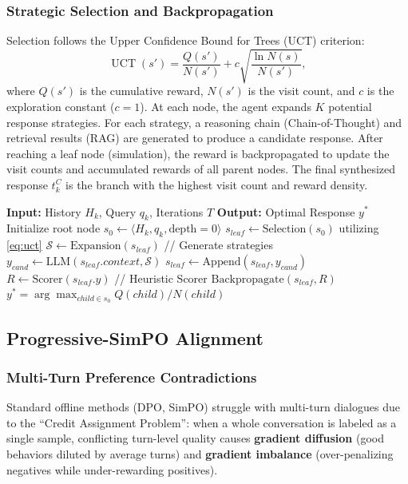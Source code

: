 \documentclass[lettersize,journal]{IEEEtran}
\begin{document}
\subsubsection{Strategic Selection and Backpropagation}
Selection follows the Upper Confidence Bound for Trees (UCT) criterion:
\begin{equation}
\label{eq:uct}
\operatorname{UCT}(s') = \frac{Q(s')}{N(s')} + c \sqrt{\frac{\ln N(s)}{N(s')}},
\end{equation}
where $Q(s')$ is the cumulative reward, $N(s')$ is the visit count, and $c$ is the exploration constant ($c=1$). 
At each node, the agent expands $K$ potential response strategies. For each strategy, a reasoning chain (Chain-of-Thought) and retrieval results (RAG) are generated to produce a candidate response. After reaching a leaf node (simulation), the reward is backpropagated to update the visit counts and accumulated rewards of all parent nodes. The final synthesized response $t_k^C$ is the branch with the highest visit count and reward density.

\begin{algorithm}[H]
\caption{CoRA-MCTS for Counselor Agency}
\label{alg:mcts}
\begin{algorithmic}[1]
\STATE \textbf{Input:} History $H_k$, Query $q_k$, Iterations $T$
\STATE \textbf{Output:} Optimal Response $y^*$
\STATE Initialize root node $s_0 \leftarrow \langle H_k, q_k, \text{depth}=0 \rangle$
    \STATE $s_{leaf} \leftarrow \text{Selection}(s_0)$ utilizing \cref{eq:uct}
        \STATE $\mathcal{S} \leftarrow \text{Expansion}(s_{leaf})$ // Generate strategies
        \STATE $y_{cand} \leftarrow \text{LLM}(s_{leaf}.context, \mathcal{S})$
        \STATE $s_{leaf} \leftarrow \text{Append}(s_{leaf}, y_{cand})$
    \ENDIF
    \STATE $R \leftarrow \text{Scorer}(s_{leaf}.y)$ // Heuristic Scorer
    \STATE $\text{Backpropagate}(s_{leaf}, R)$
\ENDFOR
\STATE \RETURN $y^* = \arg\max_{child \in s_0} Q(child)/N(child)$
\end{algorithmic}
\end{algorithm}

\subsection{Progressive-SimPO Alignment}

\subsubsection{Multi-Turn Preference Contradictions}
Standard offline methods (DPO, SimPO) struggle with multi-turn dialogues due to the ``Credit Assignment Problem'': when a whole conversation is labeled as a single sample, conflicting turn-level quality causes \textbf{gradient diffusion} (good behaviors diluted by average turns) and \textbf{gradient imbalance} (over-penalizing negatives while under-rewarding positives).
\end{document}

